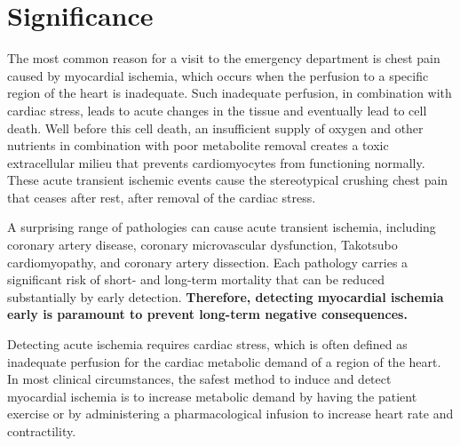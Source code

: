\section{Significance}
\label{sec:signif}

The most common reason for a visit to the emergency department is chest pain caused by myocardial ischemia\cite{BLZ:Saf2018,BLZ:Bhu2010}, which occurs when the perfusion to a specific region of the heart is inadequate.\cite{BMB:Hea94,BMB:Fal2007} Such inadequate perfusion, in combination with cardiac stress, leads to acute changes in the tissue and eventually lead to cell death. Well before this cell death, an insufficient supply of oxygen and other nutrients in combination with poor metabolite removal creates a toxic extracellular milieu that prevents cardiomyocytes from functioning normally.\cite{BMB:Kat2011,BMB:Foz86} These acute transient ischemic events cause the stereotypical crushing chest pain that ceases after rest, \ie{} after removal of the cardiac stress.\cite{BMB:Kat2011,BMB:Sur2011b}

A surprising range of pathologies can cause acute transient ischemia, including coronary artery disease, coronary microvascular dysfunction, Takotsubo cardiomyopathy, and coronary artery dissection.\cite{BLZ:Saf2018,BLZ:Jes2013,BLZ:Noe2017,BLZ:Jes2012} Each pathology carries a significant risk of short- and long-term mortality that can be reduced substantially by early detection.\cite{BLZ:Noe2017} \textbf{Therefore, detecting myocardial ischemia early is paramount to prevent long-term negative consequences.}\cite{BMB:Kon99,BLZ:Saf2018,BLZ:Knu2018a}

Detecting acute ischemia requires cardiac stress, which is often defined as inadequate perfusion for the cardiac metabolic demand of a region of the heart.\cite{BLZ:Pue2004} In most clinical circumstances, the safest method to induce and detect myocardial ischemia is to increase metabolic demand by having the patient exercise or by administering a pharmacological infusion to increase heart rate and contractility.\cite{RSM:Ste2002,BLZ:Saf2018,BLZ:Knu2018a}

